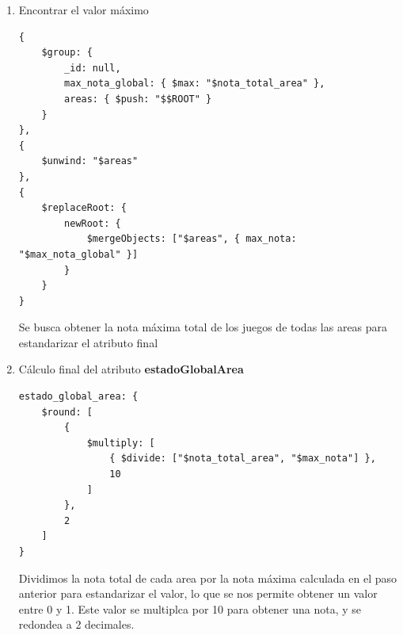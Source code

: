 \documentclass[]{article}
\begin{document}
\begin{itemize}
\begin{enumerate}
\begin{lstlisting}
    }
}
        \end{lstlisting}

        \item Encontrar el valor máximo
        
        \begin{lstlisting}
{
    $group: {
        _id: null,
        max_nota_global: { $max: "$nota_total_area" },
        areas: { $push: "$$ROOT" }
    }
},
{
    $unwind: "$areas"
},
{
    $replaceRoot: {
        newRoot: {
            $mergeObjects: ["$areas", { max_nota: "$max_nota_global" }]
        }
    }
}
        \end{lstlisting}

        Se busca obtener la nota máxima total de los juegos de todas las areas para estandarizar el atributo final
    
        \item Cálculo final del atributo \textbf{estadoGlobalArea}
        
        \begin{lstlisting}
estado_global_area: {
    $round: [
        {
            $multiply: [
                { $divide: ["$nota_total_area", "$max_nota"] },
                10
            ]
        },
        2
    ]
}
        \end{lstlisting}

        Dividimos la nota total de cada area por la nota máxima calculada en el paso anterior para estandarizar el valor, lo que se nos permite obtener un valor entre 0 y 1. Este valor se multiplca por 10 para obtener una nota, y se redondea a 2 decimales.

    \end{enumerate}
\end{itemize}
\end{document}
